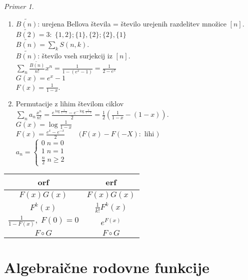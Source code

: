 \documentclass[a4paper, 12pt]{book}
\theoremstyle{definition}
\theoremstyle{remark}
\newtheorem*{ex}{Primer}
\begin{document}
\begin{ex} \text{} \\
  \begin{enumerate}[label=(\arabic*)]
    \item $\tilde{B(n)}$: urejena Bellova števila = število urejenih razdelitev množice $[n]$. \\
      $\tilde{B(2)} = 3: \; \{1,2\}; \{1\},\{2\}; \{2\},\{1\}$ \\
      $\tilde{B(n)} = \sum_k S(n,k)$. \\
      $\tilde{B(n)}$: število vseh surjekcij iz $[n]$. \\
      $\sum_n \frac{\tilde{B(n)}}{n!} x^n = \frac{1}{1-(e^x-1)} = \frac{1}{2-e^x}$ \\
      $G(x) = e^x-1$ \\
      $F(x) = \frac{1}{1-x}$.
    \item Permutacije z lihim številom ciklov \\
      $\sum_n a_n \frac{x^n}{n!} = \frac{e^{\log \frac{1}{1-x}} - e^{-\log \frac{1}{1-x}}}{2} =
        \frac{1}{2} \left(\frac{1}{1-x} - (1-x)\right)$. \\
      $G(x) = \log \frac{1}{1-x}$ \\
      $F(x) = \frac{e^x - e^{-x}}{2} \qquad (F(x)-F(-X):$ lihi $)$ \\
      $a_n = \begin{cases}
        0 \; n = 0 \\
        1 \; n = 1 \\
        \frac{n}{2} \; n \geq 2
      \end{cases}$
  \end{enumerate}  
\end{ex}
\begin{center}
  \begin{tabular}{c | c}
    orf & erf \\
    \hline
    $F(x) G(x)$ & $F(x) G(x)$ \\
    $F^k(x)$ & $\frac{1}{k!} F^k(x)$ \\
    $\frac{1}{1-F(x)}, \; F(0) = 0$ & $e^{F(x)}$ \\
    $F \circ G$ & $F \circ G$
  \end{tabular}
\end{center}


\section{Algebraične rodovne funkcije}
\end{document}
